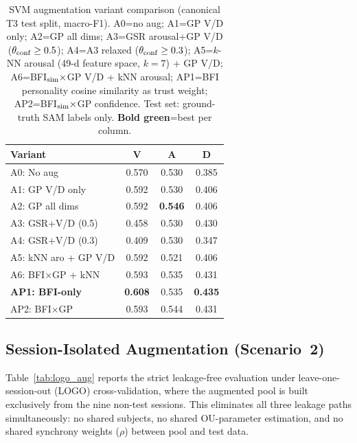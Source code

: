 \documentclass[sigconf,nonacm]{acmart}
\newcommand{\best}[1]{\textbf{\textcolor{bestcol}{#1}}}
\begin{document}
\begin{table}[t]
\caption{SVM augmentation variant comparison (canonical T3 test split,
  macro-F1). A0=no aug; A1=GP V/D only; A2=GP all dims;
  A3=GSR arousal+GP V/D ($\theta_{\rm conf}\geq 0.5$);
  A4=A3 relaxed ($\theta_{\rm conf}\geq 0.3$);
  A5=$k$-NN arousal (49-d feature space, $k{=}7$) + GP V/D;
  A6=BFI$_{\rm sim}\times$GP V/D + kNN arousal;
  AP1=BFI personality cosine similarity as trust weight;
  AP2=BFI$_{\rm sim}\times$GP confidence.
  Test set: ground-truth SAM labels only.
  \best{Bold green}=best per column.}
\label{tab:svm_aug}
\centering
\setlength{\tabcolsep}{4pt}
\small
\begin{tabular}{lccc}
\toprule
\textbf{Variant} & \textbf{V} & \textbf{A} & \textbf{D} \\
\midrule
A0: No aug          & 0.570 & 0.530 & 0.385 \\
A1: GP V/D only     & 0.592 & 0.530 & 0.406 \\
A2: GP all dims     & 0.592 & \best{0.546} & 0.406 \\
A3: GSR+V/D (0.5)   & 0.458 & 0.530 & 0.430 \\
A4: GSR+V/D (0.3)   & 0.409 & 0.530 & 0.347 \\
A5: kNN aro + GP V/D & 0.592 & 0.521 & 0.406 \\
A6: BFI$\times$GP + kNN & 0.593 & 0.535 & 0.431 \\
\midrule
\best{AP1: BFI-only}  & \best{0.608} & 0.535 & \best{0.435} \\
AP2: BFI$\times$GP  & 0.593 & 0.544 & 0.431 \\
\bottomrule
\end{tabular}
\end{table}

\subsection{Session-Isolated Augmentation (Scenario~2)}
\label{sec:logo_aug}

Table~\ref{tab:logo_aug} reports the strict leakage-free evaluation under
leave-one-session-out (LOGO) cross-validation, where the augmented pool
is built exclusively from the nine non-test sessions.
This eliminates all three leakage paths simultaneously: no shared subjects,
no shared OU-parameter estimation, and no shared synchrony weights ($\rho$)
between pool and test data.
\end{document}
